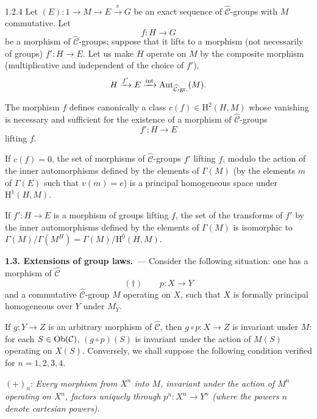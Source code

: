 \begin{proposition}{1.2.4}
\label{III.1.2.4}
Let \((E)\colon 1\to M\to E\xrightarrow{v}G\) be an exact sequence of
\(\widehat{\mathcal{C}}\)-groups with \(M\) commutative. Let
\[
f\colon H\longrightarrow G
\]
be a morphism of \(\widehat{\mathcal{C}}\)-groups; suppose that it lifts to a
morphism (not necessarily of groups) \(f'\colon H\to E\). Let us make \(H\)
operate on \(M\) by the composite morphism (multiplicative and independent of
the choice of \(f'\)),
\[
H\xrightarrow{f'}E\xrightarrow{\mathrm{int}}
  \operatorname{Aut}_{\widehat{\mathcal{C}}\textup{-gr.}}(M).
\]
\begin{enumeratei}
\item The morphism \(f\) defines canonically a class
\(c(f)\in\mathrm{H}^{2}(H,M)\) whose vanishing is necessary and sufficient
for the existence of a morphism of \(\widehat{\mathcal{C}}\)-groups
\[
f'\colon H\longrightarrow E
\]
lifting \(f\).
\item If \(c(f)=0\), the set of morphisms of \(\widehat{\mathcal{C}}\)-groups
\(f'\) lifting \(f\), modulo the action of the inner automorphisms defined by
the elements of \(\Gamma(M)\) (\ie by the elements \(m\) of \(\Gamma(E)\) such
that \(v(m)=e\)) is a principal homogeneous space under
\(\mathrm{H}^{1}(H,M)\).
\item If \(f'\colon H\to E\) is a morphism of groups lifting \(f\), the set of
the transforms of \(f'\) by the inner automorphisms defined by the elements
of \(\Gamma(M)\) is isomorphic to
\(\Gamma(M)/\Gamma(M^{H})=\Gamma(M)/\mathrm{H}^{0}(H,M)\).
\end{enumeratei}
\end{proposition}

\par{}%
\noindent\textbf{1.3. Extensions of group laws.}\ ---
\label{III.1.3}
Consider the following situation: one has a morphism of
\(\widehat{\mathcal{C}}\)
\[
(\dagger)\qquad p\colon X\longrightarrow Y
\]
and a commutative \(\widehat{\mathcal{C}}\)-group \(M\) operating on \(X\), such
that \(X\) is formally principal homogeneous over \(Y\) under \(M_{Y}\).

If \(g\colon Y\to Z\) is an arbitrary morphism of \(\widehat{\mathcal{C}}\),
then \(g\circ p\colon X\to Z\) is invariant under \(M\): for each
\(S\in\operatorname{Ob}(\mathcal{C})\), \((g\circ p)(S)\) is invariant under the action of
\(M(S)\) operating on \(X(S)\). Conversely, we shall suppose the following
condition verified for \(n=1,2,3,4\).

\((+)_n\): \emph{Every morphism from \(X^{n}\) into \(M\), invariant under
the action of \(M^{n}\) operating on \(X^{n}\), factors uniquely through
\(p^{n}\colon X^{n}\to Y^{n}\) (where the powers \(n\) denote cartesian
powers).}

